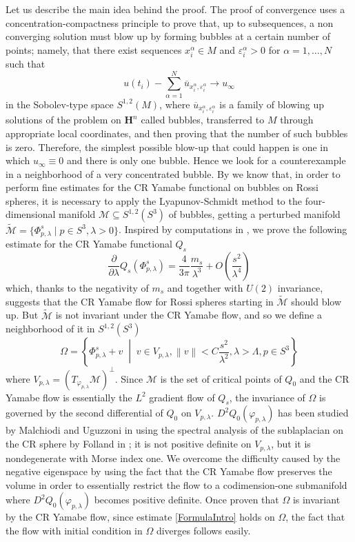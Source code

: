 \documentclass[10pt,a4paper]{amsart}
\renewcommand{\phi}{\varphi}
\newcommand{\de}{\partial}
\newcommand{\ci}[1]{\mathscr{#1}}%
\newcommand{\N}[1]{\left\lVert#1\right\rVert}
\renewcommand{\H}{\mathbf{H}}
\newcommand{\e}{\varepsilon}
\begin{document}
Let us describe the main idea behind the proof.
 The proof of convergence uses a concentration-compactness principle to prove that, up to subsequences, a non converging solution must blow up by forming bubbles at a certain number of points; namely, that there exist sequences $x_i^{\alpha}\in M$ and $\e_i^{\alpha}>0$ for $\alpha=1,\ldots,N$ such that
$$u(t_i) - \sum_{\alpha=1}^N\overline{u}_{x_i^{\alpha},\e_i^{\alpha}} \to u_{\infty}$$
in the Sobolev-type space $S^{1,2}(M)$, where $\overline{u}_{x_i^{\alpha},\e_i^{\alpha}}$ is a family of blowing up solutions of the problem on $\H^n$ called bubbles, transferred to $M$ through appropriate local coordinates, and then proving that the number of such bubbles is zero. Therefore, the simplest possible blow-up that could happen is one in which $u_{\infty}\equiv 0$ and there is only one bubble.
Hence we look for a counterexample in a neighborhood of  a very concentrated bubble.
By \cite{CMY2} we know that, in order to perform fine estimates for the CR Yamabe functional on bubbles on Rossi spheres, it is necessary to apply the Lyapunov-Schmidt method to the four-dimensional manifold $\ci{M}\subseteq S^{1,2}(S^3)$ of bubbles, getting a perturbed manifold $\widetilde{\ci{M}}=\{\Phi_{p,\lambda}^s\;|\;p\in S^3,\lambda>0\}$.
Inspired by computations in \cite{CMY2}, we prove the following estimate for the CR Yamabe functional $Q_s$
\begin{equation}\label{FormulaIntro}
    \frac{\de}{\de\lambda}Q_s(\Phi_{p,\lambda}^s) = \frac{4}{3\pi}\frac{m_s}{\lambda^3} + O\left(\frac{s^2}{\lambda^4}\right)
\end{equation}
 which, thanks to the negativity of $m_s$ and together with $U(2)$ invariance, suggests that the CR Yamabe flow for Rossi spheres starting in $\widetilde{\ci{M}}$ should blow up.
But $\widetilde{\ci{M}}$ is not invariant under the CR Yamabe flow, and so we define a neighborhood of it in $S^{1,2}(S^3)$
$$\Omega=\left\{\Phi_{p,\lambda}^s+v\;\middle|\; v\in V_{p,\lambda}, \N{v}<C\frac{s^2}{\lambda^2}, \lambda>\Lambda,p\in S^3
\right\}$$
where $V_{p,\lambda}=(T_{\phi_{p,\lambda}}\ci{M})^{\perp}$. Since $\ci{M}$ is the set of critical points of $Q_0$ and the CR Yamabe flow is essentially the $L^2$ gradient flow of $Q_s$, the invariance of $\Omega$ is governed by the second differential of $Q_0$ on $V_{p,\lambda}$.
$D^2Q_0(\phi_{p,\lambda})$ has been studied by Malchiodi and Uguzzoni in \cite{MU} using the spectral analysis of the sublaplacian on the CR sphere by Folland in \cite{F}; it is not positive definite on $V_{p,\lambda}$, but it is nondegenerate with Morse index one. We overcome the difficulty caused by the negative eigenspace by using the fact that the CR Yamabe flow preserves the volume in order to essentially restrict the flow to a codimension-one submanifold where $D^2Q_0(\phi_{p,\lambda})$ becomes positive definite.
Once proven that $\Omega$ is invariant by the CR Yamabe flow, since estimate \eqref{FormulaIntro} holds on $\Omega$, the fact that the flow with initial condition in $\Omega$ diverges follows easily.
\end{document}
